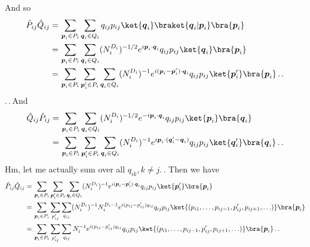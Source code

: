 \documentclass{report}
\begin{document}
And so
\begin{align}
\begin{aligned}
	\hat P_{ij} \hat Q_{ij}  =&\,  
		\sum_{\boldsymbol{p}_i \in P_i} \sum_{\boldsymbol{q}_i \in Q_i} 
			q_{ij} p_{ij} 
			\ket{\boldsymbol{q}_i} 
				\braket{\boldsymbol{q}_i | \boldsymbol{p}_i} 
			\bra{\boldsymbol{p}_i} \\
		=&\,
		\sum_{\boldsymbol{p}_i \in P_i} \sum_{\boldsymbol{q}_i \in Q_i} 
			(N_i^{D_i})^{-1/2} e^{i \boldsymbol{p}_i \cdot \boldsymbol{q}_i} q_{ij} p_{ij} 
			\ket{\boldsymbol{q}_i} 
			\bra{\boldsymbol{p}_i} \\
		=&\,
		\sum_{\boldsymbol{p}_i \in P_i} \sum_{\boldsymbol{p}_i' \in P_i} 
		\sum_{\boldsymbol{q}_i \in Q_i} 
			(N_i^{D_i})^{-1} e^{i (\boldsymbol{p}_i - \boldsymbol{p}_i') \cdot \boldsymbol{q}_i} q_{ij} p_{ij} 
			\ket{\boldsymbol{p}_i'} 
			\bra{\boldsymbol{p}_i}\,.\,.
\end{aligned}
\end{align}
.\,.\,And
\begin{align}
\begin{aligned}
	\hat Q_{ij} \hat P_{ij} 
		=&\,
		\sum_{\boldsymbol{p}_i \in P_i} \sum_{\boldsymbol{q}_i \in Q_i} 
			(N_i^{D_i})^{-1/2} 
			e^{- i \boldsymbol{p}_i \cdot \boldsymbol{q}_i} q_{ij} p_{ij} 
			\ket{\boldsymbol{p}_i} 
			\bra{\boldsymbol{q}_i} \\
		=&\,
		\sum_{\boldsymbol{p}_i \in P_i} \sum_{\boldsymbol{p}_i' \in P_i} 
		\sum_{\boldsymbol{q}_i \in Q_i} 
			(N_i^{D_i})^{-1} 
			e^{i \boldsymbol{p}_i \cdot (\boldsymbol{q}_i' - \boldsymbol{q}_i)} q_{ij} p_{ij} 
			\ket{\boldsymbol{q}_i'} 
			\bra{\boldsymbol{q}_i}\,.\,.
\end{aligned}
\end{align}
Hm, let me actually sum over all $q_{ik}, k\neq j$.\,. Then we have
\begin{align}
\begin{aligned}
	\hat P_{ij} \hat Q_{ij}  
	=&\,
	\sum_{\boldsymbol{p}_i \in P_i} \sum_{\boldsymbol{p}_i' \in P_i} 
	\sum_{\boldsymbol{q}_i \in Q_i} 
		(N_i^{D_i})^{-1} 
		e^{i (\boldsymbol{p}_i - \boldsymbol{p}_i') \cdot \boldsymbol{q}_i} q_{ij} p_{ij} 
		\ket{\boldsymbol{p}_i'} 
		\bra{\boldsymbol{p}_i} \\
	=&\,
	\sum_{\boldsymbol{p}_i \in P_i} \sum_{p_{ij}'} \sum_{q_{ij}} 
		(N_i^{D_i})^{-1} N_i^{D_i - 1}
		e^{i (p_{ij} - p_{ij}')  q_{ij}} q_{ij} p_{ij} 
		\ket{(p_{i1}, \ldots, p_{i j-1}, p_{ij}', p_{i j+1}, \ldots)} 
		\bra{\boldsymbol{p}_i} \\
	=&\,
	\sum_{\boldsymbol{p}_i \in P_i} \sum_{p_{ij}'} \sum_{q_{ij}} 
		N_i^{-1}
		e^{i (p_{ij} - p_{ij}')  q_{ij}} q_{ij} p_{ij} 
		\ket{(p_{i1}, \ldots, p_{i j-1}, p_{ij}', p_{i j+1}, \ldots)} 
		\bra{\boldsymbol{p}_i} \,.\,.
\end{aligned}
\end{align}
\end{document}
